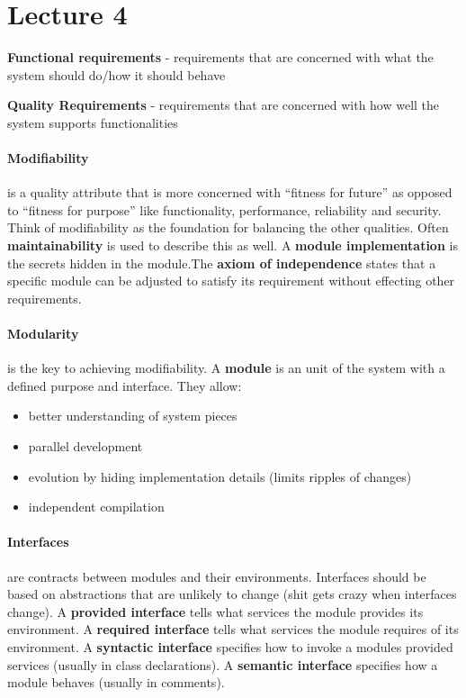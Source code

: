 \documentclass{article}
\begin{document}
\section*{Lecture 4} %
\label{sec:lecture_4}
\textbf{Functional requirements} - requirements that are concerned with what the system should do/how it should behave

\textbf{Quality Requirements} - requirements that are concerned with how well the system supports functionalities

\paragraph{Modifiability} %
\label{par:modifiability}
is  a quality attribute that is more concerned with ``fitness for future'' as opposed to ``fitness for purpose'' like functionality, performance, reliability and security. Think of modifiability as the foundation for balancing the other qualities. Often \textbf{maintainability} is used to describe this as well. A \textbf{module implementation} is the secrets hidden in the module.The \textbf{axiom of independence} states that a specific module can be adjusted to satisfy its requirement without effecting other requirements.

\paragraph{Modularity} %
\label{par:modularity}
is the key to achieving modifiability. A \textbf{module} is an unit of the system with a defined purpose and interface. They allow:
\begin{itemize}
    \item better understanding of system pieces
    \item parallel development
    \item evolution by hiding implementation details (limits ripples of changes)
    \item independent compilation
\end{itemize}

\paragraph{Interfaces} %
\label{par:interfaces}
are contracts between modules and their environments. Interfaces should be based on abstractions that are unlikely to change (shit gets crazy when interfaces change). A \textbf{provided interface} tells what services the module provides its environment. A \textbf{required interface} tells what services the module requires of its environment. A \textbf{syntactic interface} specifies how to invoke a modules provided services (usually in class declarations). A \textbf{semantic interface} specifies how a module behaves (usually in comments).
\end{document}

